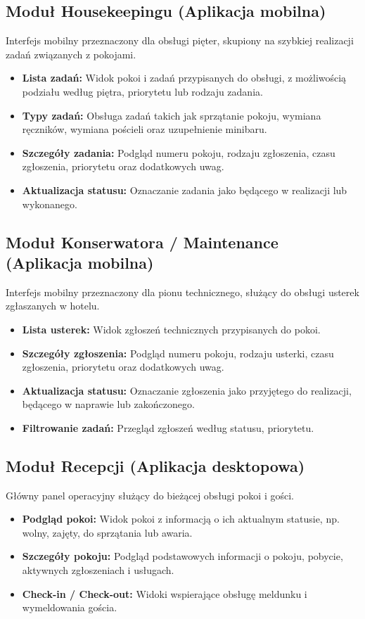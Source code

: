 \subsection{Moduł Housekeepingu (Aplikacja mobilna)}
Interfejs mobilny przeznaczony dla obsługi pięter, skupiony na szybkiej realizacji zadań związanych z pokojami.
\begin{itemize}
    \item \textbf{Lista zadań:} Widok pokoi i zadań przypisanych do obsługi, z możliwością podziału według piętra, priorytetu lub rodzaju zadania.
    \item \textbf{Typy zadań:} Obsługa zadań takich jak sprzątanie pokoju, wymiana ręczników, wymiana pościeli oraz uzupełnienie minibaru.
    \item \textbf{Szczegóły zadania:} Podgląd numeru pokoju, rodzaju zgłoszenia, czasu zgłoszenia, priorytetu oraz dodatkowych uwag.
    \item \textbf{Aktualizacja statusu:} Oznaczanie zadania jako będącego w realizacji lub wykonanego.
\end{itemize}

\newpage

\subsection{Moduł Konserwatora / Maintenance (Aplikacja mobilna)}
Interfejs mobilny przeznaczony dla pionu technicznego, służący do obsługi usterek zgłaszanych w hotelu.
\begin{itemize}
    \item \textbf{Lista usterek:} Widok zgłoszeń technicznych przypisanych do pokoi.
    \item \textbf{Szczegóły zgłoszenia:} Podgląd numeru pokoju, rodzaju usterki, czasu zgłoszenia, priorytetu oraz dodatkowych uwag.
    \item \textbf{Aktualizacja statusu:} Oznaczanie zgłoszenia jako przyjętego do realizacji, będącego w naprawie lub zakończonego.
    \item \textbf{Filtrowanie zadań:} Przegląd zgłoszeń według statusu, priorytetu.
\end{itemize}

\subsection{Moduł Recepcji (Aplikacja desktopowa)}
Główny panel operacyjny służący do bieżącej obsługi pokoi i gości.
\begin{itemize}
    \item \textbf{Podgląd pokoi:} Widok pokoi z informacją o ich aktualnym statusie, np. wolny, zajęty, do sprzątania lub awaria.
    \item \textbf{Szczegóły pokoju:} Podgląd podstawowych informacji o pokoju, pobycie, aktywnych zgłoszeniach i usługach.
    \item \textbf{Check-in / Check-out:} Widoki wspierające obsługę meldunku i wymeldowania gościa.
\end{itemize}

